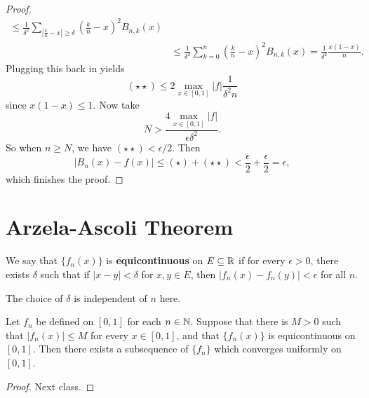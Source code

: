 \begin{proof}
\begin{align*}
    \le \frac{1}{\delta^2} \sum_{\left|\frac{k}{n} - x\right| \ge \delta} \left(\frac{k}{n} - x\right)^2 B_{n, k}(x) \\
                                                               &\le \frac{1}{\delta^2} \sum_{k = 0}^n \left(\frac{k}{n} - x\right)^2 B_{n, k}(x)
    = \frac{1}{\delta^2} \frac{x(1 - x)}{n}.
  \end{align*}
  Plugging this back in yields
  \[
    (\star \star) \le 2 \max_{x \in [0, 1]} |f| \frac{1}{\delta^2n}
  \]
  since $x(1 - x) \le 1$. Now
  take
  \[N > \frac{4\max_{x \in [0, 1]}|f|}{\epsilon \delta^2}.\]
  So when $n \ge N$, we have $(\star \star) < \epsilon / 2$.
  Then 
  \[|B_n(x) - f(x)| \le (\star) + (\star \star) < \frac{\epsilon}{2} + \frac{\epsilon}{2} = \epsilon,\]
  which finishes the proof.
\end{proof}

\section{Arzela-Ascoli Theorem}

\begin{definition}
  We say that $\{f_n(x)\}$ is \textbf{equicontinuous}
  on $E \subseteq \mathbb{R}$ if for every $\epsilon > 0$,
  there exists $\delta$ such that if
  $|x - y| < \delta$ for $x, y \in E$, then
  $|f_n(x) - f_n(y)| < \epsilon$ for all $n$.
\end{definition}

\begin{remark}
  The choice of $\delta$ is independent of $n$ here.
\end{remark}

\begin{theorem}
  Let $f_n$ be defined on $[0, 1]$ for each $n \in \mathbb{N}$.
  Suppose that there is $M > 0$ such that
  $|f_n(x)| \le M$ for every $x \in [0, 1]$,
  and that $\{f_n(x)\}$ is equicontinuous on $[0, 1]$.
  Then there exists a subsequence of $\{f_n\}$ which
  converges uniformly on $[0, 1]$.
\end{theorem}

\begin{proof}
  Next class.
\end{proof}
